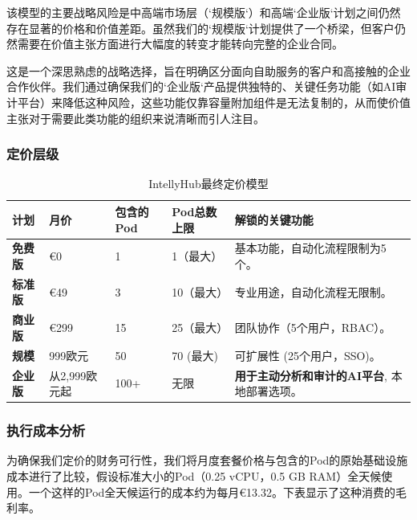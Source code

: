 \documentclass[11pt, a4paper, oneside]{article}
\begin{document}
该模型的主要战略风险是中高端市场层（`规模版`）和高端`企业版`计划之间仍然存在显著的价格和价值差距。虽然我们的`规模版`计划提供了一个桥梁，但客户仍然需要在价值主张方面进行大幅度的转变才能转向完整的企业合同。

这是一个深思熟虑的战略选择，旨在明确区分面向自助服务的客户和高接触的企业合作伙伴。我们通过确保我们的`企业版`产品提供独特的、关键任务功能（如AI审计平台）来降低这种风险，这些功能仅靠容量附加组件是无法复制的，从而使价值主张对于需要此类功能的组织来说清晰而引人注目。

\subsubsection{定价层级}

\begin{table}[H]
\centering
\caption{IntellyHub最终定价模型}
\label{tab:final_pricing_model}
\begin{tabularx}{\textwidth}{l L L L L} 
\toprule
\textbf{计划} & \textbf{月价} & \textbf{包含的Pod} & \textbf{Pod总数上限} & \textbf{解锁的关键功能} \\
\midrule
\textbf{免费版} & \euro{0} & 1 & 1（最大） & 基本功能，自动化流程限制为5个。 \\
\addlinespace
\textbf{标准版} & \euro{49} & 3 & 10（最大） & 专业用途，自动化流程无限制。 \\
\addlinespace
\textbf{商业版} & \euro{299} & 15 & 25（最大） & 团队协作（5个用户，RBAC）。 \\
\addlinespace



\textbf{规模} & 999欧元 & 50 & 70 (最大) & 可扩展性 (25个用户，SSO)。 \\
\addlinespace
\textbf{企业版} & 从2,999欧元起 & 100+ & 无限 & \textbf{用于主动分析和审计的AI平台}, 本地部署选项。 \\
\bottomrule
\end{tabularx}
\end{table}

\subsubsection{执行成本分析}

为确保我们定价的财务可行性，我们将月度套餐价格与包含的Pod的原始基础设施成本进行了比较，假设标准大小的Pod（0.25 vCPU，0.5 GB RAM）全天候使用。一个这样的Pod全天候运行的成本约为每月\euro{13.32}。下表显示了这种消费的毛利率。
\end{document}
